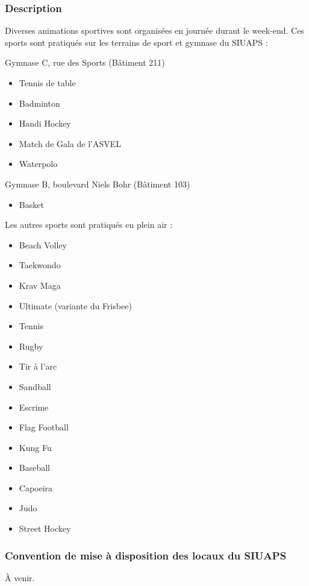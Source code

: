 \documentclass[hidelinks, paper=a4, fontsize=13pt]{report}
\begin{document}
\subsubsection{Description}

Diverses animations sportives sont organisées en journée durant le week-end. Ces sports sont pratiqués sur les terrains de sport et gymnase du SIUAPS :


Gymnase C, rue des Sports (Bâtiment 211)
\begin{itemize}
\item Tennis de table
\item Badminton
\item Handi Hockey
\item Match de Gala de l'ASVEL
\item Waterpolo
\end{itemize}

Gymnase B, boulevard Niels Bohr (Bâtiment 103)
\begin{itemize}
\item Basket
\end{itemize}



Les autres sports sont pratiqués en plein air :
\begin{itemize}
\item Beach Volley
\item Taekwondo
\item Krav Maga
\item Ultimate (variante du Frisbee)
\item Tennis
\item Rugby
\item Tir à l’arc
\item Sandball
\item Escrime
\item Flag Football
\item Kung Fu
\item Baseball
\item Capoeira
\item Judo
\item Street Hockey
\end{itemize}

\subsubsection{Convention de mise à disposition des locaux du SIUAPS}
À venir.
\end{document}
